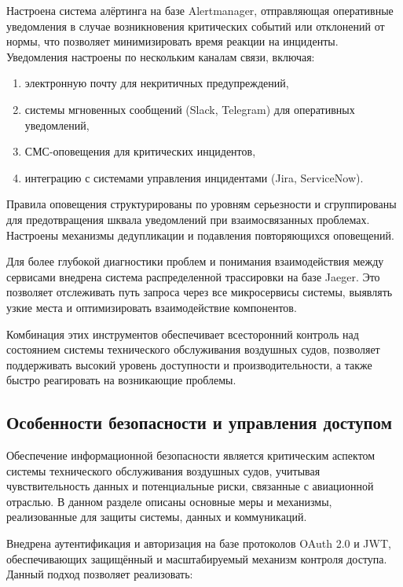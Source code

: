 \documentclass[14pt,a4paper]{extarticle}
\begin{document}
Настроена система алёртинга на базе Alertmanager, отправляющая оперативные уведомления в случае возникновения критических событий или отклонений от нормы, что позволяет минимизировать время реакции на инциденты. Уведомления настроены по нескольким каналам связи, включая:

\begin{enumerate}
\item электронную почту для некритичных предупреждений,
\item системы мгновенных сообщений (Slack, Telegram) для оперативных уведомлений,
\item СМС-оповещения для критических инцидентов,
\item интеграцию с системами управления инцидентами (Jira, ServiceNow).
\end{enumerate}

Правила оповещения структурированы по уровням серьезности и сгруппированы для предотвращения шквала уведомлений при взаимосвязанных проблемах. Настроены механизмы дедупликации и подавления повторяющихся оповещений.

Для более глубокой диагностики проблем и понимания взаимодействия между сервисами внедрена система распределенной трассировки на базе Jaeger. Это позволяет отслеживать путь запроса через все микросервисы системы, выявлять узкие места и оптимизировать взаимодействие компонентов.

Комбинация этих инструментов обеспечивает всесторонний контроль над состоянием системы технического обслуживания воздушных судов, позволяет поддерживать высокий уровень доступности и производительности, а также быстро реагировать на возникающие проблемы.

\subsection{Особенности безопасности и управления доступом}

Обеспечение информационной безопасности является критическим аспектом системы технического обслуживания воздушных судов, учитывая чувствительность данных и потенциальные риски, связанные с авиационной отраслью. В данном разделе описаны основные меры и механизмы, реализованные для защиты системы, данных и коммуникаций.

Внедрена аутентификация и авторизация на базе протоколов OAuth 2.0 и JWT, обеспечивающих защищённый и масштабируемый механизм контроля доступа. Данный подход позволяет реализовать:
\end{document}
